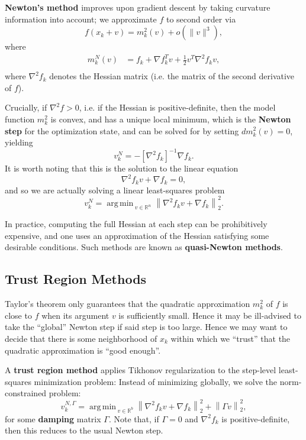 \documentclass[reqno]{amsart}
\DeclareMathOperator*{\argmin}{arg\,min\,}
\numberwithin{equation}{section}
\begin{document}
\textbf{Newton's method} improves upon gradient descent by taking curvature
information into account; we approximate $f$ to second order via
$$
    f(x_k + v) = m^2_k(v) + o(\|v\|^3),
$$
where
\begin{align*}
    m^{N}_k(v) &= f_k + \nabla f_k^T v + \frac{1}{2} v^T \nabla^2 f_k v, \\
\end{align*}
where $\nabla^2 f_k$ denotes the Hessian matrix (i.e. the matrix of the second
derivative of $f$).

Crucially, if $\nabla^2 f > 0$, i.e. if the Hessian is positive-definite, then
the model function $m^2_k$ is convex, and has a unique local minimum, which is
the \textbf{Newton step} for the optimization state, and can be solved for by
setting $d m^2_k(v) = 0$, yielding
$$
    v^N_k = - [\nabla^2 f_k]^{-1} \nabla f_k.
$$
It is worth noting that this is the solution to the linear equation
$$
    \nabla^2 f_k v + \nabla f_k = 0,
$$
and so we are actually solving a linear least-squares problem
$$
    v^N_k = \argmin_{v \in \mathbb R^n} \left\| \nabla^2 f_k v + \nabla f_k \right\|_2^2.
$$

In practice, computing the full Hessian at each step can be prohibitively expensive,
and one uses an approximation of the Hessian satisfying some desirable conditions.
Such methods are known as \textbf{quasi-Newton methods}.

\subsection{Trust Region Methods}

Taylor's theorem only guarantees that the quadratic approximation $m^2_k$ of $f$
is close to $f$ when its argument $v$ is sufficiently small. Hence it may be
ill-advised to take the ``global'' Newton step if said step is too large. Hence
we may want to decide that there is some neighborhood
of $x_k$ within which we ``trust'' that the
quadratic approximation is ``good enough''.

A \textbf{trust region method} applies Tikhonov regularization to the step-level
least-squares minimization problem: Instead of minimizing globally, we solve
the norm-constrained problem:
$$
    v^{N,\Gamma}_k = \argmin_{v \in \mathbb R^b} \left\| \nabla^2 f_k v + \nabla f_k \right\|_2^2
        + \left\| \Gamma v \right\|_2^2,
$$
for some \textbf{damping} matrix $\Gamma$. Note that, if $\Gamma = 0$ and 
$\nabla^2 f_k$ is positive-definite, then this reduces to the usual Newton step.
\end{document}

